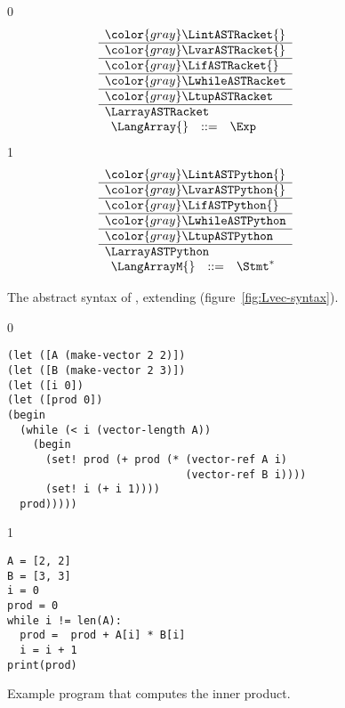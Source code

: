 \documentclass[7x10]{TimesAPriori_MIT}%
\newcommand{\gray}[1]{{\color{gray} #1}}
\def\racketEd{0}
\def\pythonEd{1}
\def\edition{1}
\newcommand{\pythonColor}[0]{}
\numberwithin{theorem}{chapter}
\numberwithin{definition}{chapter}
\numberwithin{equation}{chapter}
\begin{document}
\begin{figure}[tp]
\centering
\begin{tcolorbox}[colback=white]
    \small
{\if\edition\racketEd    
\[
\begin{array}{l}
  \gray{\LintASTRacket{}} \\ \hline
  \gray{\LvarASTRacket{}} \\ \hline
  \gray{\LifASTRacket{}} \\ \hline
  \gray{\LwhileASTRacket} \\ \hline
  \gray{\LtupASTRacket} \\ \hline
  \LarrayASTRacket \\
\begin{array}{lcl}
  \LangArray{} &::=& \Exp
\end{array}
\end{array}
\]
\fi}
{\if\edition\pythonEd\pythonColor    
\[
\begin{array}{l}
  \gray{\LintASTPython{}} \\ \hline
  \gray{\LvarASTPython{}} \\ \hline
  \gray{\LifASTPython{}} \\ \hline
  \gray{\LwhileASTPython} \\ \hline
  \gray{\LtupASTPython} \\ \hline
  \LarrayASTPython \\
\begin{array}{rcl}
  \LangArrayM{} &::=& \Stmt^{*}
\end{array}
\end{array}
\]
\fi}
\end{tcolorbox}
\caption{The abstract syntax of \LangArray{}, extending \LangVec{} (figure~\ref{fig:Lvec-syntax}).}
\label{fig:Lvecof-syntax}
\end{figure}


\begin{figure}[tp]
\begin{tcolorbox}[colback=white]  
{\if\edition\racketEd
\begin{lstlisting}
(let ([A (make-vector 2 2)])
(let ([B (make-vector 2 3)])
(let ([i 0])
(let ([prod 0])
(begin
  (while (< i (vector-length A))
    (begin
      (set! prod (+ prod (* (vector-ref A i)
                            (vector-ref B i))))
      (set! i (+ i 1))))
  prod)))))
\end{lstlisting}
\fi}
{\if\edition\pythonEd\pythonColor    
\begin{lstlisting}
A = [2, 2]
B = [3, 3]
i = 0
prod = 0
while i != len(A):
  prod =  prod + A[i] * B[i]
  i = i + 1
print(prod)
\end{lstlisting}
\fi}
\end{tcolorbox}

\caption{Example program that computes the inner product.}
\label{fig:inner_product}
\end{figure}
\end{document}

